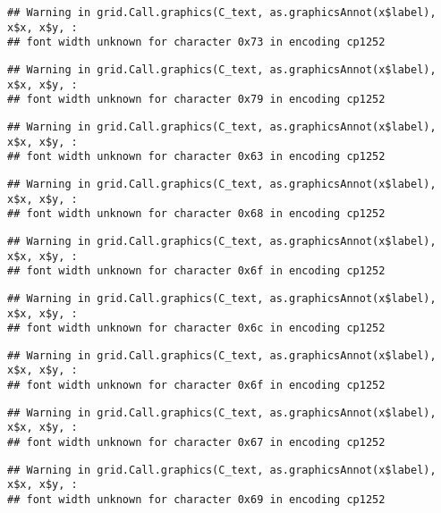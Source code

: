 \documentclass[
]{article}
\begin{document}
\begin{verbatim}
## Warning in grid.Call.graphics(C_text, as.graphicsAnnot(x$label), x$x, x$y, :
## font width unknown for character 0x73 in encoding cp1252
\end{verbatim}

\begin{verbatim}
## Warning in grid.Call.graphics(C_text, as.graphicsAnnot(x$label), x$x, x$y, :
## font width unknown for character 0x79 in encoding cp1252
\end{verbatim}

\begin{verbatim}
## Warning in grid.Call.graphics(C_text, as.graphicsAnnot(x$label), x$x, x$y, :
## font width unknown for character 0x63 in encoding cp1252
\end{verbatim}

\begin{verbatim}
## Warning in grid.Call.graphics(C_text, as.graphicsAnnot(x$label), x$x, x$y, :
## font width unknown for character 0x68 in encoding cp1252
\end{verbatim}

\begin{verbatim}
## Warning in grid.Call.graphics(C_text, as.graphicsAnnot(x$label), x$x, x$y, :
## font width unknown for character 0x6f in encoding cp1252
\end{verbatim}

\begin{verbatim}
## Warning in grid.Call.graphics(C_text, as.graphicsAnnot(x$label), x$x, x$y, :
## font width unknown for character 0x6c in encoding cp1252
\end{verbatim}

\begin{verbatim}
## Warning in grid.Call.graphics(C_text, as.graphicsAnnot(x$label), x$x, x$y, :
## font width unknown for character 0x6f in encoding cp1252
\end{verbatim}

\begin{verbatim}
## Warning in grid.Call.graphics(C_text, as.graphicsAnnot(x$label), x$x, x$y, :
## font width unknown for character 0x67 in encoding cp1252
\end{verbatim}

\begin{verbatim}
## Warning in grid.Call.graphics(C_text, as.graphicsAnnot(x$label), x$x, x$y, :
## font width unknown for character 0x69 in encoding cp1252
\end{verbatim}
\end{document}
